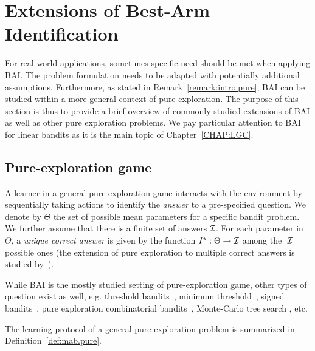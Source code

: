 \section{Extensions of Best-Arm Identification}\label{sec:mab.extensions}

For real-world applications, sometimes specific need should be met when applying BAI. The problem formulation needs to be adapted with potentially additional assumptions. Furthermore, as stated in Remark~\ref{remark:intro.pure}, BAI can be studied within a more general context of pure exploration. The purpose of this section is thus to provide a brief overview of commonly studied extensions of BAI as well as other pure exploration problems. We pay particular attention to BAI for linear bandits as it is the main topic of Chapter~\ref{CHAP:LGC}.

\subsection{Pure-exploration game}\label{sec:mab.extensions.pure}

A learner in a general pure-exploration game interacts with the environment by sequentially taking actions to identify the \emph{answer} to a pre-specified question. We denote by $\Theta$ the set of possible mean parameters for a specific bandit problem. We further assume that there is a finite set of answers $\mathcal{I}$. For each parameter in $\Theta$, a \emph{unique correct answer} is given by the function $I^\star:\Theta \to \mathcal{I}$ among the $|\mathcal{I}|$ possible ones (the extension of pure exploration to multiple correct answers is studied by~\citealt{degenne2019pure}).

While BAI is the mostly studied setting of pure-exploration game, other types of question exist as well, e.g. threshold bandits~\citep{locatelli2016thresholding}, minimum threshold~\citep{kaufmann2018murphy}, signed bandits~\citep{menard2019lma}, pure exploration combinatorial bandits~\citep{chen2014combinatorial}, Monte-Carlo tree search \citep{teraoka2014mc}, etc.

The learning protocol of a general pure exploration problem is summarized in Definition~\ref{def:mab.pure}.

